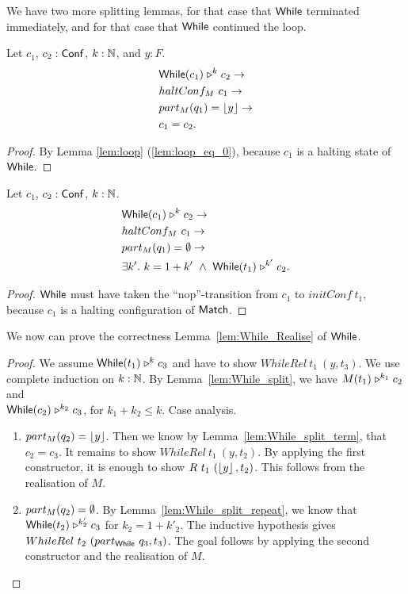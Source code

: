 We have two more splitting lemmas, for that case that $\mathsf{While}$ terminated immediately, and for that case that $\mathsf{While}$ continued the loop.
\begin{lemma}
  \label{lem:While_split_term}
  Let $c_1$, $c_2 : \mathsf{Conf}$, $k:\mathbb{N}$, and $y:F$.
  \begin{alignat*}{1}
    & \mathsf{While}(c_1) \mathrel{\triangleright}^k c_2 \rightarrow \\
    & haltConf_M~c_1 \rightarrow \\
    & part_M(q_1) = \left\lfloor {y} \right\rfloor \rightarrow \\
    & c_1 = c_2.
  \end{alignat*}
\end{lemma}
\begin{proof}
  By Lemma \ref{lem:loop} (\ref{lem:loop_eq_0}), because $c_1$ is a halting state of $\mathsf{While}$.
\end{proof}
\begin{lemma}
  \label{lem:While_split_repeat}
  Let $c_1$, $c_2 : \mathsf{Conf}$, $k:\mathbb{N}$.
  \begin{alignat*}{1}
    & \mathsf{While}(c_1) \mathrel{\triangleright}^k c_2 \rightarrow \\
    & haltConf_M~c_1 \rightarrow \\
    & part_M(q_1) = \emptyset \rightarrow \\
    & \exists k'.~k = 1+k' ~\land~ \mathsf{While}(t_1) \mathrel{\triangleright}^{k'} c_2.
  \end{alignat*}
\end{lemma}
\begin{proof}
  $\mathsf{While}$ must have taken the ``nop''-transition from $c_1$ to $initConf~t_1$, because $c_1$ is a halting configuration of $\mathsf{Match}$.
\end{proof}

We now can prove the correctness Lemma~\ref{lem:While_Realise} of $\mathsf{While}$.
\begin{proof}
  We assume $\mathsf{While}(t_1) \mathrel{\triangleright}^k c_3$ and have to show $WhileRel~t_1~(y, t_3)$.  We use complete induction on $k:\mathbb{N}$.  By
  Lemma~\ref{lem:While_split}, we have $M(t_1) \mathrel{\triangleright}^{k_1} c_2$ and\\ $\mathsf{While}(c_2) \mathrel{\triangleright}^{k_2} c_3$, for $k_1+k_2 \leq k$.  Case
  analysis.
  \begin{enumerate}
  \item $part_M(q_2) = \left\lfloor {y} \right\rfloor$.  Then we know by Lemma~\ref{lem:While_split_term}, that $c_2=c_3$.  It remains to show $WhileRel~t_1~(y, t_2)$.  By
    applying the first constructor, it is enough to show $R~t_1~(\left\lfloor {y} \right\rfloor, t_2)$.  This follows from the realisation of $M$.
  \item $part_M(q_2) = \emptyset$.  By Lemma~\ref{lem:While_split_repeat}, we know that $\mathsf{While}(t_2) \mathrel{\triangleright}^{k'_2} c_3$ for $k_2 = 1 + k'_2$.  The
    inductive hypothesis gives $WhileRel~t_2~(part_{\mathsf{While}}~q_3, t_3)$.  The goal follows by applying the second constructor and the realisation of $M$.
  \end{enumerate}
\end{proof}


